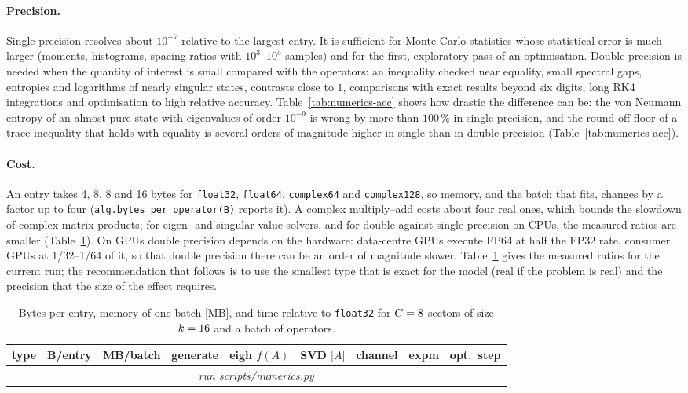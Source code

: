 \documentclass[11pt]{article}
\providecommand{\NumTimeRows}{\multicolumn{9}{c}{\emph{run scripts/numerics.py}}\\}
\providecommand{\NumTimeHeader}{generate & eigh $f(A)$ & SVD $|A|$ & channel & expm & opt.\ step}
\begin{document}
\paragraph{Precision.} Single precision resolves about $10^{-7}$ relative to the largest entry. It is
sufficient for Monte Carlo statistics whose statistical error is much larger (moments, histograms,
spacing ratios with $10^3$--$10^5$ samples) and for the first, exploratory pass of an optimisation.
Double precision is needed when the quantity of interest is small compared with the operators: an
inequality checked near equality, small spectral gaps, entropies and logarithms of nearly singular
states, contrasts close to $1$, comparisons with exact results beyond six digits, long RK4 integrations
and optimisation to high relative accuracy. Table~\ref{tab:numerics-acc} shows how drastic the
difference can be: the von Neumann entropy of an almost pure state with eigenvalues of order $10^{-9}$ is
wrong by more than $100\,\%$ in single precision, and the round-off floor of a trace inequality that
holds with equality is several orders of magnitude higher in single than in double precision (Table~\ref{tab:numerics-acc}).

\paragraph{Cost.} An entry takes 4, 8, 8 and 16 bytes for \texttt{float32}, \texttt{float64},
\texttt{complex64} and \texttt{complex128}, so memory, and the batch that fits, changes by a factor up to four
(\texttt{alg.bytes\_per\_operator(B)} reports it). A complex multiply--add costs about four real ones, which bounds the
slowdown of complex matrix products; for eigen- and singular-value solvers, and for double against single precision
on CPUs, the measured ratios are smaller (Table~\ref{tab:numerics-time}). On GPUs double precision depends on the
hardware: data-centre GPUs execute
FP64 at half the FP32 rate, consumer GPUs at 1/32--1/64 of it, so that double precision there can be an
order of magnitude slower. Table~\ref{tab:numerics-time} gives the measured ratios for the current run;
the recommendation that follows is to use the smallest type that is exact for the model (real if the
problem is real) and the precision that the size of the effect requires.

\begin{table}[h]
\centering\small
\begin{tabular}{lrrrrrrrr}
\toprule
type & B/entry & MB/batch & \NumTimeHeader\\
\midrule
\NumTimeRows
\bottomrule
\end{tabular}
\caption{Bytes per entry, memory of one batch [MB], and time relative to \texttt{float32} for $C=\IfFileExists{generated/numerics.tex}{\NumC}{8}$
sectors of size $k=\IfFileExists{generated/numerics.tex}{\NumK}{16}$ and a batch of
 operators.}
\label{tab:numerics-time}
\end{table}
\end{document}
